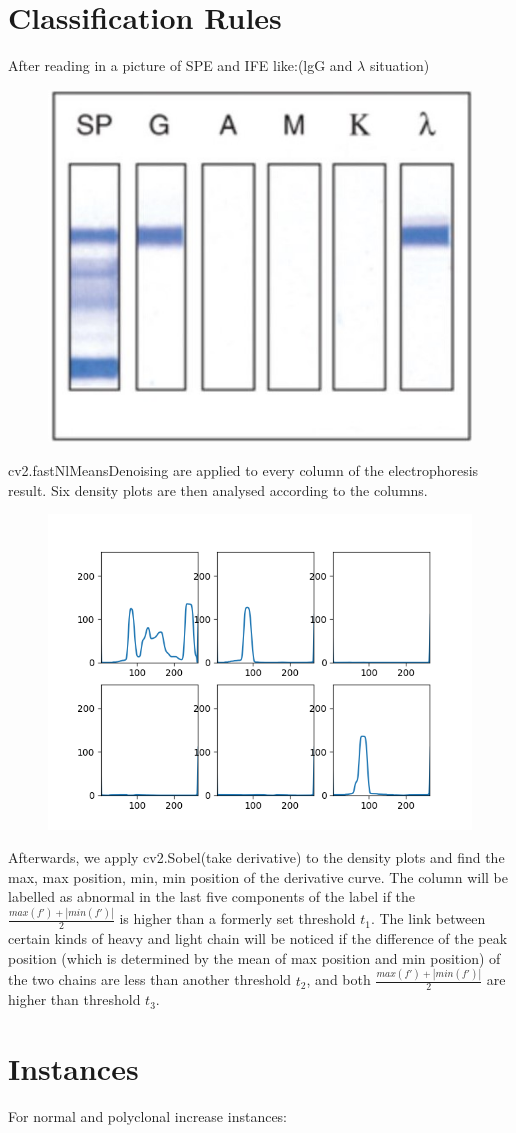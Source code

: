 \documentclass[12pt]{ctexart}
\begin{document}
\section{Classification Rules}
\par After reading in a picture of SPE and IFE like:(lgG and $\lambda$ situation)
\begin{figure}[H]
    \centering
    \includegraphics[width=0.5\linewidth]{gl.jpg}
\end{figure}
cv2.fastNlMeansDenoising are applied to every column of the electrophoresis result. Six density plots are then analysed according to the columns.
\begin{figure}[H]
    \centering
    \includegraphics[width=0.5\linewidth]{lgG-lambda.png}
\end{figure}
Afterwards, we apply cv2.Sobel(take derivative) to the density plots and find the max, max position, min, min position of the derivative curve. The column will be labelled as abnormal in the last five components of the label if the $\frac{max(f')+|min(f')|}{2}$ is higher than a formerly set threshold $t_1$. The link between certain kinds of heavy and light chain will be noticed if the difference of the peak position (which is determined by the mean of max position and min position) of the two chains are less than another threshold $t_2$, and both $\frac{max(f')+|min(f')|}{2}$ are higher than threshold $t_3$.
\section{Instances}
For normal and polyclonal increase instances:
\end{document}
